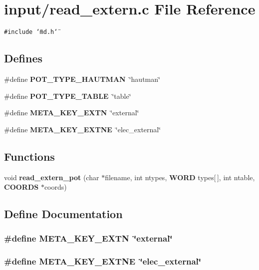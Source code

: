 \section{input/read\_\-extern.c File Reference}
\label{read__extern_8c}
{\tt \#include \char`\"{}md.h\char`\"{}}\par
\subsection*{Defines}
\begin{CompactItemize}
\item 
\#define {\bf POT\_\-TYPE\_\-HAUTMAN}~\char`\"{}hautman\char`\"{}
\item 
\#define {\bf POT\_\-TYPE\_\-TABLE}~\char`\"{}table\char`\"{}
\item 
\#define {\bf META\_\-KEY\_\-EXTN}~\char`\"{}external\char`\"{}
\item 
\#define {\bf META\_\-KEY\_\-EXTNE}~\char`\"{}elec\_\-external\char`\"{}
\end{CompactItemize}
\subsection*{Functions}
\begin{CompactItemize}
\item 
void {\bf read\_\-extern\_\-pot} (char $\ast$filename, int ntypes, {\bf WORD} types[$\,$], int ntable, {\bf COORDS} $\ast$coords)
\end{CompactItemize}


\subsection{Define Documentation}
\subsubsection{\setlength{\rightskip}{0pt plus 5cm}\#define META\_\-KEY\_\-EXTN~\char`\"{}external\char`\"{}}\label{read__extern_8c_fffc3fef730f5b2806c5985e0073c6f3}


\subsubsection{\setlength{\rightskip}{0pt plus 5cm}\#define META\_\-KEY\_\-EXTNE~\char`\"{}elec\_\-external\char`\"{}}\label{read__extern_8c_08ddb940a9897e4db00a0717b848b629}


